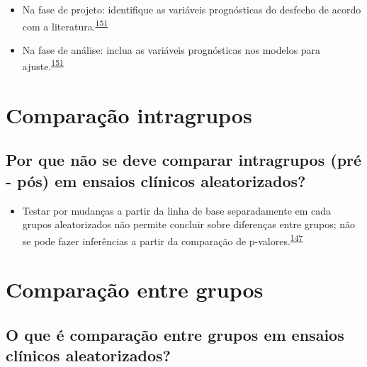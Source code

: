 \documentclass[
  a4paper,
]{book}
\providecommand{\tightlist}{%
  \setlength{\itemsep}{0pt}\setlength{\parskip}{0pt}}
\begin{document}
\begin{itemize}
\item
  Na fase de projeto: identifique as variáveis prognósticas do desfecho de acordo com a literatura.\textsuperscript{\protect\hyperlink{ref-roberts1999}{151}}
\item
  Na fase de análise: inclua as variáveis prognósticas nos modelos para ajuste.\textsuperscript{\protect\hyperlink{ref-roberts1999}{151}}
\end{itemize}

\hypertarget{comparacao-intragrupos}{%
\section{Comparação intragrupos}\label{comparacao-intragrupos}}

\hypertarget{por-que-nuxe3o-se-deve-comparar-intragrupos-pruxe9---puxf3s-em-ensaios-cluxednicos-aleatorizados}{%
\subsection{Por que não se deve comparar intragrupos (pré - pós) em ensaios clínicos aleatorizados?}\label{por-que-nuxe3o-se-deve-comparar-intragrupos-pruxe9---puxf3s-em-ensaios-cluxednicos-aleatorizados}}

\begin{itemize}
\tightlist
\item
  Testar por mudanças a partir da linha de base separadamente em cada grupos aleatorizados não permite concluir sobre diferenças entre grupos; não se pode fazer inferências a partir da comparação de p-valores.\textsuperscript{\protect\hyperlink{ref-bland2011}{147}}
\end{itemize}

\hypertarget{comparacao-entre-grupos}{%
\section{Comparação entre grupos}\label{comparacao-entre-grupos}}

\hypertarget{o-que-uxe9-comparauxe7uxe3o-entre-grupos-em-ensaios-cluxednicos-aleatorizados}{%
\subsection{O que é comparação entre grupos em ensaios clínicos aleatorizados?}\label{o-que-uxe9-comparauxe7uxe3o-entre-grupos-em-ensaios-cluxednicos-aleatorizados}}
\end{document}
